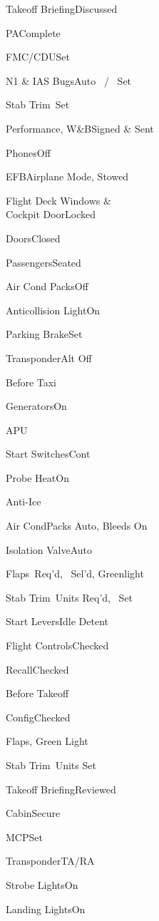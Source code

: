 \documentclass[sim-use, blue_items, halfpage]{checklist}
\begin{document}
\begin{continuedchecklist}
  \item{Takeoff Briefing}{Discussed}
  \item{PA}{Complete}
  \item{FMC/CDU}{Set}
  \item{N1 \& IAS Bugs}{Auto \blank\ / \blank\ Set}
  \item{Stab Trim}{\blank\ Set}
  \item{Performance, W\&B}{Signed \& Sent}
  \item{Phones}{Off}
  \item{EFB}{Airplane Mode, Stowed}
  \item{Flight Deck Windows \&\\Cockpit Door}{Locked}
  \item{Doors}{Closed}
  \item{Passengers}{Seated}
  \line
  \item{Air Cond Packs}{Off}
  \item{Anticollision Light}{On}
  \item{Parking Brake}{Set}
  \item{Transponder}{Alt Off}
\end{continuedchecklist}

\begin{checklist}{Before Taxi}
  \item{Generators}{On}
  \item{APU}{\blank}
  \item{Start Switches}{Cont}
  \item{Probe Heat}{On}
  \item{Anti-Ice}{\blank}
  \item{Air Cond}{Packs Auto, Bleeds On}
  \item{Isolation Valve}{Auto}
  \item{Flaps}{\blank\ Req'd, \blank\ Sel'd, Greenlight}
  \item{Stab Trim}{\blank\ Units Req'd, \blank\ Set}
  \item{Start Levers}{Idle Detent}
  \item{Flight Controls}{Checked}
  \item{Recall}{Checked}
\end{checklist}

\begin{checklist}{Before Takeoff}
  \item{Config}{Checked}
  \item{Flaps}{\blank, Green Light}
  \item{Stab Trim}{\blank\ Units Set}
  \item{Takeoff Briefing}{Reviewed}
  \item{Cabin}{Secure}
  \line
  \item{MCP}{Set}
  \item{Transponder}{TA/RA}
  \item{Strobe Lights}{On}
  \item{Landing Lights}{On}
\end{checklist}
\end{document}
